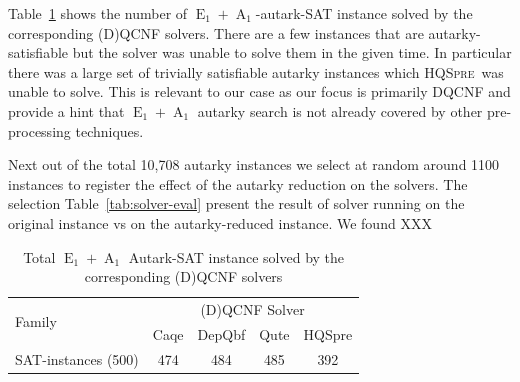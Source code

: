 \documentclass[runningheads]{llncs}
\DeclareMathOperator{\Aaut}{A}
\DeclareMathOperator{\Eaut}{E}
\newcommand{\hqspre}{\textsc{HQSpre}}
\begin{document}
Table~\ref{tab:sat-solver} shows the number of $\Eaut_1+\Aaut_1$-autark-SAT instance solved by the corresponding (D)QCNF solvers. There are a few instances that are autarky-satisfiable but the solver was unable to solve them in the given time. In particular there was a large set of trivially satisfiable autarky instances which \hqspre\ was unable to solve. This is relevant to our case as our focus is primarily DQCNF and provide a hint that $\Eaut_1+\Aaut_1$ autarky search is not already covered by other pre-processing techniques.

Next out of the total 10,708 autarky instances we select at random around 1100 instances to register the effect of the autarky reduction on the solvers. The selection
%
Table~\ref{tab:solver-eval} present the result of solver running on the original instance vs on the autarky-reduced instance. We found XXX



\begin{table}
	\caption{Total $\Eaut_1+\Aaut_1$ Autark-SAT instance solved by the corresponding (D)QCNF solvers}\label{tab:sat-solver}
	\begin{tabular}{l|c|c|c|c}

		\hline
		\multirow{2}{3cm}{Family}  & \multicolumn{4}{c}{(D)QCNF Solver} \\
		\cline{2-5}
		& Caqe & DepQbf & Qute & HQSpre  \\

		\hline

		SAT-instances (500) &  474 & 484 & 485 & 392 \\

		\hline
	\end{tabular}
\end{table}
\end{document}

